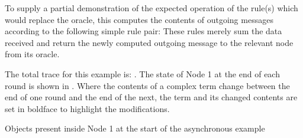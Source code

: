 
To supply a partial demonstration of the expected operation of the rule(s) which would replace the oracle, this  computes the contents of outgoing messages according to the following simple rule pair: 
These rules merely sum the data received and return the newly computed outgoing message to the relevant node from its oracle.

\setcounter{traces}{-1}

The total trace for this example is:  \tarr{}  \tarr{}  \tarr{}  \tarr{}  \tarr{} .  The state of Node 1 at the end of each round is shown in .  Where the contents of a complex term change between the end of one round and the end of the next, the term and its changed contents are set in boldface to highlight the modifications.

\begin{cpobjectsfloat}
\begin{cpobjects}
\end{cpobjects}
\caption{\label{objs:nmp:ex0}Objects present inside Node 1 at the start of the asynchronous  example}
\end{cpobjectsfloat}

